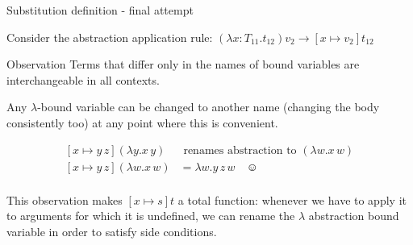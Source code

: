 \documentclass[8pt]{beamer}
\begin{document}
\begin{frame}{Substitution definition - final attempt}

    Consider the abstraction application rule:
        $(\lambda x:T_{11}.t_{12})v_{2} \rightarrow [x \mapsto v_{2}]t_{12}$

    \begin{block}{Observation}
        Terms that differ only in the names of bound variables are 
        interchangeable in all contexts.
    \end{block}

    \pause

    Any $\lambda$-bound variable can be changed to another name (changing the body 
    consistently too) at any point where this is convenient.

    \begin{example}
        \begin{displaymath}
            \begin{split}
                [x \mapsto y \, z](\lambda y.x \, y) &
                    \text{ renames abstraction to } (\lambda w.x \, w)\\ 
                [x \mapsto y \, z](\lambda w.x \, w) &= \lambda w. y \, z \, w \quad \smiley\\
            \end{split}
        \end{displaymath}
    \end{example}

    \pause

    This observation makes $[x \mapsto s]t$ a total function: 
    whenever we have to apply it to arguments for which it is 
    undefined, we can rename the $\lambda$ abstraction bound variable
    in order to satisfy side conditions.
\end{frame}
\end{document}
